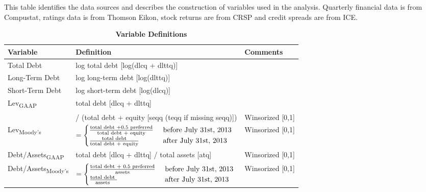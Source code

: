 \documentclass[a4paper, 12pt]{article}
\begin{document}
\begin{table}[htbp]
\caption{\textbf{Variable Definitions}
} \label{table_vardef}

\begin{singlespace}
\begin{small}
This table identifies the data sources and describes the construction of variables used in the analysis. Quarterly financial data is from Compustat, ratings data is from Thomson Eikon, stock returns are from CRSP and credit spreads are from ICE.
\end{small}
\end{singlespace}
\vspace{2mm}

\begin{footnotesize}
\renewcommand{\arraystretch}{1.5}
\begin{tabular}{@{}lll@{}}

\hline
\textbf{Variable} & \textbf{Definition} & \textbf{Comments} \\
\hline
Total Debt & log total debt [log(dlcq + dlttq)] &  \\
Long-Term Debt & log long-term debt [log(dlttq)] &  \\
Short-Term Debt & log short-term debt [log(dlcq)]&  \\
Lev\textsubscript{GAAP} & total debt [dlcq + dlttq] \\
& / (total debt + equity [seqq (teqq if missing seqq)]) & Winsorized [0,1]\\
Lev\textsubscript{Moody's} &

\begin{math}
=
\begin{cases}
 \frac{\textnormal{total debt +0.5 preferred}}{\textnormal{total debt + equity}} & \textnormal{ before July 31st, 2013 } \\
\frac{\textnormal{total debt}}{\textnormal{total debt + equity}}  & \textnormal{ after July 31st, 2013 }
\end{cases}
\end{math}

& Winsorized [0,1]\\
Debt/Assets\textsubscript{GAAP} & total debt [dlcq + dlttq] / total assets [atq] & Winsorized [0,1] \\
Debt/Assets\textsubscript{Moody's} &

\begin{math}
=
\begin{cases}
 \frac{\textnormal{total debt + 0.5 preferred}}{\textnormal{assets}} & \textnormal{ before July 31st, 2013 } \\
 \frac{\textnormal{total debt }}{\textnormal{assets }}   & \textnormal{ after July 31st, 2013 }
\end{cases}
\end{math}
& Winsorized [0,1]\\


\end{tabular}
\end{footnotesize}
\end{table}
\end{document}
